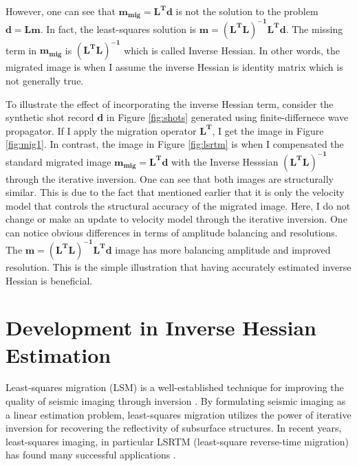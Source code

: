 However, one can see that $\mathbf{m_{mig} = L^{T}d}$ is not the solution to the problem $\mathbf{d=Lm}$. In fact, the least-squares solution is $\mathbf{m = (L^{T}L)^{-1} L^{T} d}$. The missing term in $\mathbf{m_{mig}}$ is $\mathbf{(L^{T}L)^{-1}}$ which is called Inverse Hessian. In other words, the migrated image is when I assume the inverse Hessian is identity matrix which is not generally true.





To illustrate the effect of incorporating the inverse Hessian term, consider the synthetic shot record $\mathbf{d}$ in Figure \ref{fig:shots} generated using finite-differnece wave propagator. If I apply the migration operator $\mathbf{L^T}$, I get the image in Figure \ref{fig:mig1}. In contrast, the image in Figure \ref{fig:lsrtm} is when I compensated the standard migrated image $\mathbf{m_{mig} = L^{T}d }$ with the Inverse Hesssian $\mathbf{(L^{T}L)^{-1}}$ through the iterative inversion. One can see that both images are structurally similar. This is due to the fact that mentioned earlier that it is only the velocity model that controls the structural accuracy of the migrated image. Here, I do not change or make an update to velocity model through the iterative inversion. One can notice obvious differences in terms of amplitude balancing and resolutions. The $\mathbf{m = (L^{T}L)^{-1} L^{T} d}$ image has more balancing amplitude and improved resolution. This is the simple illustration that having accurately estimated inverse Hessian is beneficial.


\section{Development in Inverse Hessian Estimation}

Least-squares migration (LSM) is a well-established technique for improving the quality of seismic imaging through inversion \cite[]{nemeth,ronen}. By formulating seismic imaging as a linear estimation problem, least-squares migration utilizes the power of iterative inversion for recovering the reflectivity of subsurface structures. In recent years, least-squares imaging, in particular LSRTM (least-square reverse-time migration) has found many successful applications \cite[]{dai,wang,wong}.

